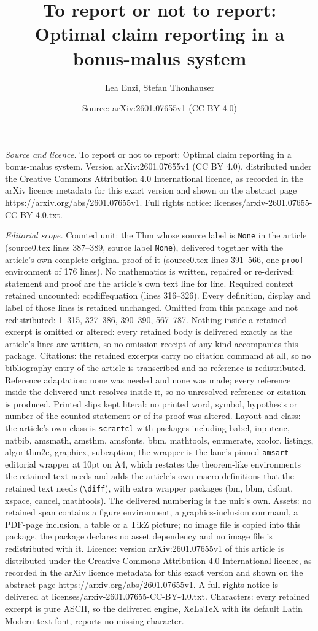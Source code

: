 \documentclass[10pt,a4paper]{amsart}
\title[To report or not to report: Optimal claim reporting in a bon]{To report or not to report: Optimal claim reporting in a bonus-malus system}
\author{Lea Enzi, Stefan Thonhauser}
\date{Source: arXiv:2601.07655v1 (CC BY 4.0)}
\begin{document}
\maketitle

\noindent\emph{Source and licence.} To report or not to report: Optimal claim reporting in a bonus-malus system. Version arXiv:2601.07655v1 (CC BY 4.0), distributed under the Creative Commons Attribution 4.0 International licence, as recorded in the arXiv licence metadata for this exact version and shown on the abstract page https://arxiv.org/abs/2601.07655v1. Full rights notice: licenses/arxiv-2601.07655-CC-BY-4.0.txt.\par\smallskip

\noindent\textit{Editorial scope.} Counted unit: the Thm whose source label is \texttt{None} in the article (source0.tex lines 387--389, source label \texttt{None}), delivered together with the article's own complete original proof of it (source0.tex lines 391--566, one \texttt{proof} environment of 176 lines). No mathematics is written, repaired or re-derived: statement and proof are the article's own text line for line. Required context retained uncounted: eq:diffequation (lines 316--326). Every definition, display and label of those lines is retained unchanged. Omitted from this package and not redistributed: 1--315, 327--386, 390--390, 567--787. Nothing inside a retained excerpt is omitted or altered: every retained body is delivered exactly as the article's lines are written, so no omission receipt of any kind accompanies this package. Citations: the retained excerpts carry no citation command at all, so no bibliography entry of the article is transcribed and no reference is redistributed. Reference adaptation: none was needed and none was made; every reference inside the delivered unit resolves inside it, so no unresolved reference or citation is produced. Printed slips kept literal: no printed word, symbol, hypothesis or number of the counted statement or of its proof was altered. Layout and class: the article's own class is \texttt{scrartcl} with packages including babel, inputenc, natbib, amsmath, amsthm, amsfonts, bbm, mathtools, enumerate, xcolor, listings, algorithm2e, graphicx, subcaption; the wrapper is the lane's pinned \texttt{amsart} editorial wrapper at 10pt on A4, which restates the theorem-like environments the retained text needs and adds the article's own macro definitions that the retained text needs (\texttt{\textbackslash diff}), with extra wrapper packages (bm, bbm, dsfont, xspace, cancel, mathtools). The delivered numbering is the unit's own. Assets: no retained span contains a figure environment, a graphics-inclusion command, a PDF-page inclusion, a table or a TikZ picture; no image file is copied into this package, the package declares no asset dependency and no image file is redistributed with it. Licence: version arXiv:2601.07655v1 of this article is distributed under the Creative Commons Attribution 4.0 International licence, as recorded in the arXiv licence metadata for this exact version and shown on the abstract page https://arxiv.org/abs/2601.07655v1. A full rights notice is delivered at licenses/arxiv-2601.07655-CC-BY-4.0.txt. Characters: every retained excerpt is pure ASCII, so the delivered engine, XeLaTeX with its default Latin Modern text font, reports no missing character.
\end{document}
